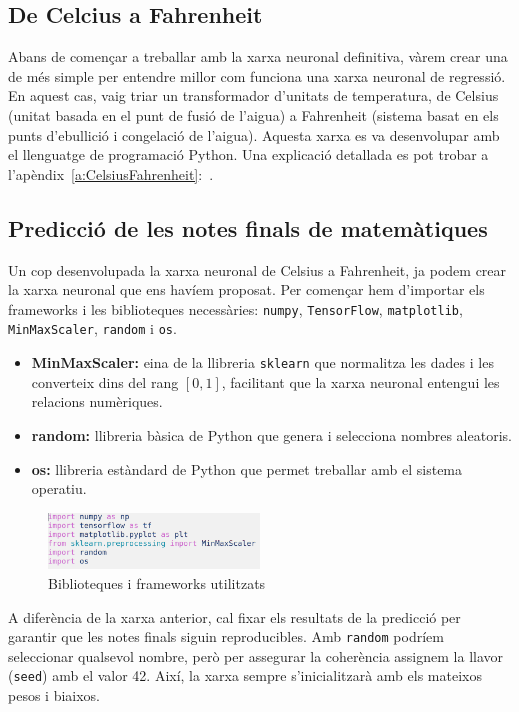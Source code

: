 \subsection{De Celcius a Fahrenheit}

Abans de començar a treballar amb la xarxa neuronal definitiva, vàrem crear una de més simple per entendre millor com funciona una xarxa neuronal de regressió. En aquest cas, vaig triar un transformador d’unitats de temperatura, de Celsius (unitat basada en el punt de fusió de l’aigua) a Fahrenheit (sistema basat en els punts d’ebullició i congelació de l’aigua). Aquesta xarxa es va desenvolupar amb el llenguatge de programació Python. Una explicació detallada es pot trobar a l'apèndix~\ref{a:CelsiusFahrenheit}:~.


\subsection{Predicció de les notes finals de matemàtiques}

Un cop desenvolupada la xarxa neuronal de Celsius a Fahrenheit, ja podem crear la xarxa neuronal que ens havíem proposat. Per començar hem d'importar els frameworks i les biblioteques necessàries: \texttt{numpy}, \texttt{TensorFlow}, \texttt{matplotlib}, \texttt{MinMaxScaler}, \texttt{random} i \texttt{os}.

\begin{itemize}
\item \textbf{MinMaxScaler:} eina de la llibreria \texttt{sklearn} que normalitza les dades i les converteix dins del rang $[0,1]$, facilitant que la xarxa neuronal entengui les relacions numèriques.
\item \textbf{random:} llibreria bàsica de Python que genera i selecciona nombres aleatoris.
\item \textbf{os:} llibreria estàndard de Python que permet treballar amb el sistema operatiu.
\end{itemize}

\begin{figure}[h!]
\centering
\includegraphics[width=0.5\textwidth]{./figures/21.png}
\caption{Biblioteques i frameworks utilitzats}
\end{figure}

A diferència de la xarxa anterior, cal fixar els resultats de la predicció per garantir que les notes finals siguin reproducibles. Amb \texttt{random} podríem seleccionar qualsevol nombre, però per assegurar la coherència assignem la llavor (\texttt{seed}) amb el valor 42. Així, la xarxa sempre s’inicialitzarà amb els mateixos pesos i biaixos.

